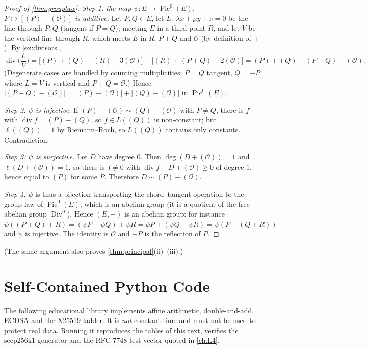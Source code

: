 \documentclass[11pt,a4paper,oneside]{book}
\theoremstyle{plain}
\theoremstyle{definition}
\theoremstyle{remark}
\newcommand{\Oinf}{\mathcal{O}}
\newcommand{\Div}{\operatorname{Div}}
\newcommand{\Pic}{\operatorname{Pic}}
\newcommand{\divv}{\operatorname{div}}
\begin{document}
\begin{proof}[Proof of \cref{thm:grouplaw}]
\emph{Step 1: the map $\psi:E\to\Pic^0(E)$, $P\mapsto[(P)-(\Oinf)]$ is additive.}
Let $P,Q\in E$, let $L:\ \lambda x+\mu y+\nu=0$ be the line through $P,Q$ (tangent if $P=Q$), meeting $E$ in a third point $R$, and let $V$ be the vertical line through $R$, which meets $E$ in $R$, $P+Q$ and $\Oinf$ (by definition of $+$). By \cref{ex:divisors},
\[
\divv\Big(\frac{L}{V}\Big)=\big[(P)+(Q)+(R)-3(\Oinf)\big]-\big[(R)+(P+Q)-2(\Oinf)\big]=(P)+(Q)-(P+Q)-(\Oinf).
\]
(Degenerate cases are handled by counting multiplicities: $P=Q$ tangent, $Q=-P$ where $L=V$ is vertical and $P+Q=\Oinf$.) Hence $\big[(P+Q)-(\Oinf)\big]=\big[(P)-(\Oinf)\big]+\big[(Q)-(\Oinf)\big]$ in $\Pic^0(E)$.

\emph{Step 2: $\psi$ is injective.} If $(P)-(\Oinf)\sim(Q)-(\Oinf)$ with $P\ne Q$, there is $f$ with $\divv f=(P)-(Q)$, so $f\in L((Q))$ is non-constant; but $\ell((Q))=1$ by Riemann--Roch, so $L((Q))$ contains only constants. Contradiction.

\emph{Step 3: $\psi$ is surjective.} Let $D$ have degree $0$. Then $\deg(D+(\Oinf))=1$ and $\ell(D+(\Oinf))=1$, so there is $f\ne0$ with $\divv f+D+(\Oinf)\ge0$ of degree $1$, hence equal to $(P)$ for some $P$. Therefore $D\sim(P)-(\Oinf)$.

\emph{Step 4.} $\psi$ is thus a bijection transporting the chord--tangent operation to the group law of $\Pic^0(E)$, which is an abelian group (it is a quotient of the free abelian group $\Div^0$). Hence $(E,+)$ is an abelian group: for instance $\psi((P+Q)+R)=(\psi P+\psi Q)+\psi R=\psi P+(\psi Q+\psi R)=\psi(P+(Q+R))$ and $\psi$ is injective. The identity is $\Oinf$ and $-P$ is the reflection of $P$.
\end{proof}

\noindent (The same argument also proves \cref{thm:principal}(ii)--(iii).)

\chapter{Self-Contained Python Code}\label{app:code}

The following educational library implements affine arithmetic, double-and-add, ECDSA and the X25519 ladder. It is \emph{not} constant-time and must not be used to protect real data. Running it reproduces the tables of this text, verifies the secp256k1 generator and the RFC 7748 test vector quoted in \cref{ch:L4}.
\end{document}
